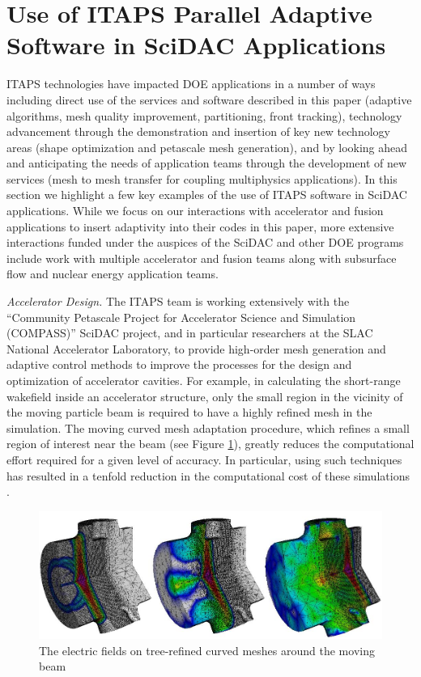 \documentclass[letterpaper]{jpconf}
\begin{document}
\section{Use of ITAPS Parallel Adaptive Software in SciDAC Applications}
\label{sec:application}

ITAPS technologies have impacted DOE applications in a number of ways
including direct use of the services and software described in this
paper (adaptive algorithms, mesh quality improvement, partitioning,
front tracking), technology advancement through the demonstration and
insertion of key new technology areas (shape optimization and
petascale mesh generation), and by looking ahead and anticipating the
needs of application teams through the development of new services
(mesh to mesh transfer for coupling multiphysics applications).  In
this section we highlight a few key examples of the use of ITAPS
software in SciDAC applications.  While we focus on our interactions
with accelerator and fusion applications to insert adaptivity into
their codes in this paper, more extensive interactions funded under
the auspices of the SciDAC and other DOE programs include work with
multiple accelerator and fusion teams along with subsurface flow and
nuclear energy application teams.

{\it Accelerator Design.} The ITAPS team is working extensively with
the ``Community Petascale Project for Accelerator Science and
Simulation (COMPASS)'' SciDAC project, and in particular researchers
at the SLAC National Accelerator Laboratory, to provide high-order
mesh generation and adaptive control methods to improve the processes
for the design and optimization of accelerator cavities. For example,
in calculating the short-range wakefield inside an accelerator
structure, only the small region in the vicinity of the moving
particle beam is required to have a highly refined mesh in the
simulation. The moving curved mesh adaptation procedure, which refines
a small region of interest near the beam (see Figure
\ref{fig:moving_mesh}), greatly reduces the computational effort
required for a given level of accuracy.  In particular, using such
techniques has resulted in a tenfold reduction in the computational
cost of these simulations \cite{luo08a, lee08}.

\begin{figure}[tbhp]
\centering
\includegraphics[width=4.5in]{Figures/moving.jpg}
\caption{\label{fig:moving_mesh} The electric fields on tree-refined curved 
meshes around the moving beam}
\end{figure}
\end{document}
